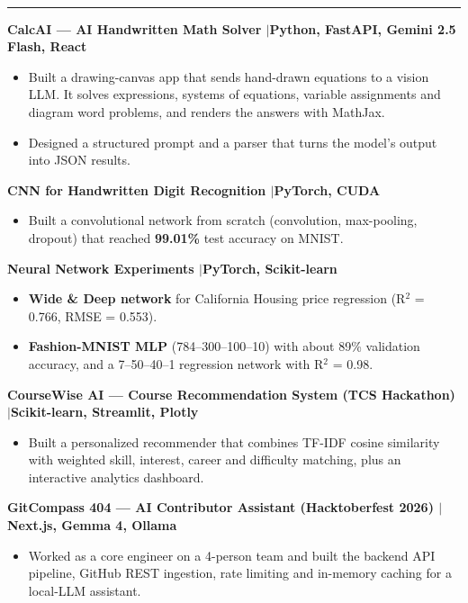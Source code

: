 \documentclass[10pt,a4paper]{article}
\renewcommand{\section}[1]{\vspace{6pt}{\large\bfseries\MakeUppercase{#1}}\\[-7pt]\rule{\textwidth}{0.6pt}\vspace{2pt}}
\newcommand{\entry}[2]{\par\textbf{#1}\hfill #2\par}
\newenvironment{points}{\vspace{-4pt}\begin{itemize}\setlength{\itemsep}{0pt}\setlength{\parskip}{0pt}\setlength{\topsep}{0pt}\setlength{\partopsep}{0pt}\setlength{\leftmargin}{12pt}}{\end{itemize}\vspace{-2pt}}
\newcommand{\sep}{\enspace$|$\enspace}
\begin{document}
\section{AI / ML Projects}
\entry{CalcAI --- AI Handwritten Math Solver \textnormal{\sep Python, FastAPI, Gemini 2.5 Flash, React}}{}
\begin{points}
  \item Built a drawing-canvas app that sends hand-drawn equations to a vision LLM. It solves expressions, systems of equations, variable assignments and diagram word problems, and renders the answers with MathJax.
  \item Designed a structured prompt and a parser that turns the model's output into JSON results.
\end{points}
\entry{CNN for Handwritten Digit Recognition \textnormal{\sep PyTorch, CUDA}}{}
\begin{points}
  \item Built a convolutional network from scratch (convolution, max-pooling, dropout) that reached \textbf{99.01\%} test accuracy on MNIST.
\end{points}
\entry{Neural Network Experiments \textnormal{\sep PyTorch, Scikit-learn}}{}
\begin{points}
  \item \textbf{Wide \& Deep network} for California Housing price regression (R$^2$ = 0.766, RMSE = 0.553).
  \item \textbf{Fashion-MNIST MLP} (784--300--100--10) with about 89\% validation accuracy, and a 7--50--40--1 regression network with R$^2$ = 0.98.
\end{points}
\entry{CourseWise AI --- Course Recommendation System (TCS Hackathon) \textnormal{\sep Scikit-learn, Streamlit, Plotly}}{}
\begin{points}
  \item Built a personalized recommender that combines TF-IDF cosine similarity with weighted skill, interest, career and difficulty matching, plus an interactive analytics dashboard.
\end{points}
\entry{GitCompass 404 --- AI Contributor Assistant (Hacktoberfest 2026) \textnormal{\sep Next.js, Gemma 4, Ollama}}{}
\begin{points}
  \item Worked as a core engineer on a 4-person team and built the backend API pipeline, GitHub REST ingestion, rate limiting and in-memory caching for a local-LLM assistant.
\end{points}
\end{document}
